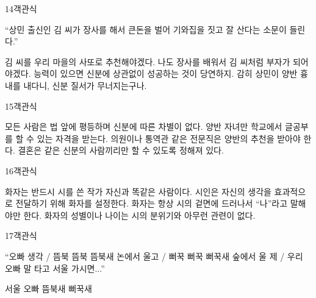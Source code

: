 \documentclass[fs95,seriesFre]{korfarm-base}
\begin{document}
\begin{kfQBlock}{14}{객관식}
\begin{kfEvidence}“상민 출신인 김 씨가 장사를 해서 큰돈을 벌어 기와집을 짓고 잘 산다는 소문이 들린다.”\end{kfEvidence}
\begin{kfChoices}
\kfChoice 김 씨를 우리 마을의 사또로 추천해야겠다.
\kfChoice 나도 장사를 배워서 김 씨처럼 부자가 되어야겠다.
\kfChoice 능력이 있으면 신분에 상관없이 성공하는 것이 당연하지.
\kfChoice 감히 상민이 양반 흉내를 내다니, 신분 질서가 무너지는구나.
\end{kfChoices}
\end{kfQBlock}

\begin{kfQBlock}{15}{객관식}
\begin{kfChoices}
\kfChoice 모든 사람은 법 앞에 평등하며 신분에 따른 차별이 없다.
\kfChoice 양반 자녀만 학교에서 글공부를 할 수 있는 자격을 받는다.
\kfChoice 의원이나 통역관 같은 전문직은 양반의 추천을 받아야 한다.
\kfChoice 결혼은 같은 신분의 사람끼리만 할 수 있도록 정해져 있다.
\end{kfChoices}
\end{kfQBlock}

\begin{kfQBlock}{16}{객관식}
\begin{kfChoices}
\kfChoice 화자는 반드시 시를 쓴 작가 자신과 똑같은 사람이다.
\kfChoice 시인은 자신의 생각을 효과적으로 전달하기 위해 화자를 설정한다.
\kfChoice 화자는 항상 시의 겉면에 드러나서 “나”라고 말해야만 한다.
\kfChoice 화자의 성별이나 나이는 시의 분위기와 아무런 관련이 없다.
\end{kfChoices}
\end{kfQBlock}

\begin{kfQBlock}{17}{객관식}
\begin{kfEvidence}“오빠 생각 / 뜸북 뜸북 뜸북새 논에서 울고 / 뻐꾹 뻐꾹 뻐꾹새 숲에서 울 제 / 우리 오빠 말 타고 서울 가시면...”\end{kfEvidence}
\begin{kfChoices}
\kfChoice 서울
\kfChoice 오빠
\kfChoice 뜸북새
\kfChoice 뻐꾹새
\end{kfChoices}
\end{kfQBlock}
\end{document}
